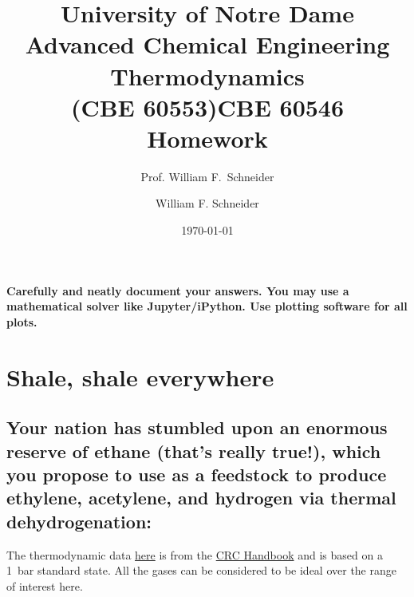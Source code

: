 \documentclass[11pt]{article}
\title{University of Notre Dame\\Advanced Chemical Engineering Thermodynamics\\(CBE 60553)}
\author{Prof. William F.\ Schneider}
\author{William F. Schneider}
\date{\today}
\title{CBE 60546 Homework}
\begin{document}
\begin{OPTIONS}
\end{OPTIONS}

\noindent \textbf{Carefully and neatly document your answers.  You may use a mathematical solver like Jupyter/iPython. Use plotting software for all plots.}

\section{Shale, shale everywhere}
\label{sec:orgae9a802}
\subsection{Your nation has stumbled upon an enormous reserve of ethane (that's really true!), which you propose to use as a feedstock to produce ethylene, acetylene, and hydrogen via thermal dehydrogenation:}
\label{sec:orgcba9d5a}

\begin{center}

\end{center}
\noindent The thermodynamic data \href{https://github.com/wmfschneider/CBE60546/blob/main/Homework/HW2-thermo.csv}{here} is from the \href{https://onesearch.library.nd.edu/permalink/f/1phik6l/ndu\_aleph002720619}{CRC Handbook} and is based on a \SI{1}{bar} standard state. All the gases can be considered to be ideal over the range of interest here.
\end{document}

